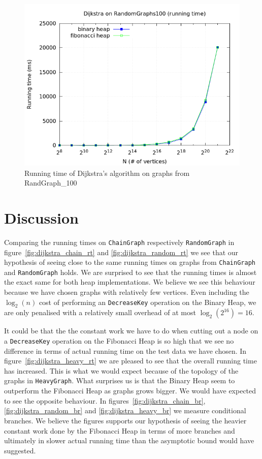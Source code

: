 \documentclass[a4paper,oneside,article,11pt]{memoir}
\begin{document}
\begin{figure}[H]
\centering
  \includegraphics[scale=0.5]{../res/dijkstra/d_rand_100_rt.png}%
  \caption{Running time of Dijkstra's algorithm on graphs from RandGraph\_100}
  \label{fig:dijkstra_rt_randomgraph100}
\end{figure}

\section{Discussion}
Comparing the running times on \texttt{ChainGraph} respectively \texttt{RandomGraph} in figure~\ref{fig:dijkstra_chain_rt} and \ref{fig:dijkstra_random_rt} we see that our hypothesis of seeing close to the same running times on graphs from \texttt{ChainGraph} and \texttt{RandomGraph} holds. We are surprised to see that the running times is almost the exact same for both heap implementations. We believe we see this behaviour because we have chosen graphs with relatively few vertices. Even including the $\log_2(n)$ cost of performing an \texttt{DecreaseKey} operation on the Binary Heap, we are only penalised with a relatively small overhead of at most $\log_2(2^{16}) = 16$.


It could be that the the constant work we have to do when cutting out a node on a \texttt{DecreaseKey} operation on the Fibonacci Heap is so high that we see no difference in terms of actual running time on the test data we have chosen. In figure~\ref{fig:dijkstra_heavy_rt} we are pleased to see that the overall running time has increased. This is what we would expect because of the topology of the graphs in \texttt{HeavyGraph}. What surprises us is that the Binary Heap seem to outperform the Fibonacci Heap as graphs grows bigger. We would have expected to see the opposite behaviour. In figures~\ref{fig:dijkstra_chain_br}, \ref{fig:dijkstra_random_br} and \ref{fig:dijkstra_heavy_br} we measure conditional branches. We believe the figures supports our hypothesis of seeing the heavier constant work done by the Fibonacci Heap in terms of more branches and ultimately in slower actual running time than the asymptotic bound would have suggested.
\end{document}

